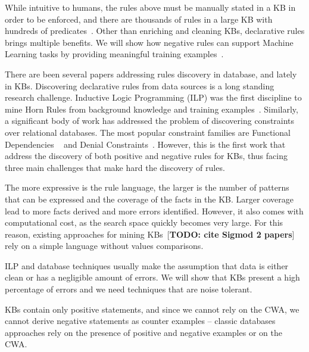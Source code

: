 While intuitive to humans, the rules above must be manually stated in a KB in order to be enforced, and there are thousands of rules in a large KB with hundreds of predicates~\cite{gc2015big}. Other than enriching and cleaning KBs, declarative rules brings multiple benefits. %
We will show how negative rules 
can support Machine Learning tasks by providing meaningful training examples~\cite{richardson2006markov,shin2015incremental}.

There are been several papers addressing rules discovery in database, and lately in KBs. 
Discovering declarative rules from data sources is a long standing research challenge. Inductive Logic Programming (ILP) was the first discipline to mine Horn Rules from background knowledge and training examples~\cite{muggleton1994inductive}. Similarly, a significant body of work has addressed the problem of discovering constraints over relational databases. The most popular constraint families are Functional Dependencies ~\cite{abiteboul1995foundations,huhtala1999tane,wyss2001fastfds} and Denial Constraints~\cite{chu2013discovering}.
However, this is the first work that address the discovery of both positive and negative rules for KBs, thus facing three main challenges that make hard the discovery of rules.

The more expressive is the rule language, the larger is the number of patterns that can be expressed and the coverage of the facts in the KB. Larger coverage lead to more facts derived and more errors identified. However, it also comes with computational cost, as the search space quickly becomes very large. For this reason, existing approaches for mining KBs~\cite{abedjan2014amending,galarraga2015fast}[{\bf TODO: cite Sigmod 2 papers}] rely on a simple language without values comparisons.

ILP and database techniques usually make the assumption that data is either clean or has a negligible amount of errors. We will show that KBs present a high percentage of errors and we need techniques that are noise tolerant.

KBs contain only positive statements, and since we cannot rely on the CWA, we cannot derive negative statements as counter examples --  classic databases approaches rely on the presence of positive and negative examples or on the CWA.  %

